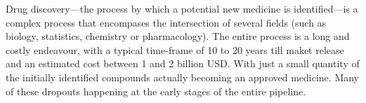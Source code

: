 \documentclass{article}
\begin{document}
    
    
    


Drug discovery—the process by which a potential new medicine is identified—is a complex
 process that encompases the intersection of several fields (such as biology, statistics,
 chemistry or pharmacology). The entire process is a long and costly endeavour, with a
 typical time-frame of 10 to 20 years till maket release and an estimated cost between 1
 and 2 billion USD. With just a small quantity of the initially identified compounds
 actually becoming an approved medicine. Many of these dropouts happening at the early
 stages of the entire pipeline.
\end{document}
